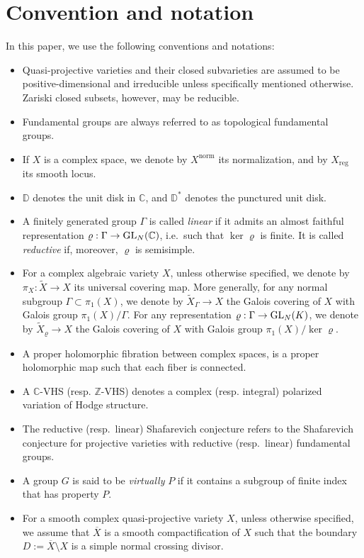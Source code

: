 \documentclass[english]{amsproc}
\theoremstyle{plain}
\theoremstyle{definition}
\theoremstyle{remark}
\theoremstyle{plain}
\numberwithin{equation}{thm} %
\newcommand{\bC}{\mathbb{C}}
\newcommand{\bD}{\mathbb{D}}
\newcommand{\GL}{{\rm GL}}
\begin{document}
		\section*{Convention and notation} In this paper, we use the following conventions and notations:
		\begin{itemize}[noitemsep]
			\item Quasi-projective varieties and their closed subvarieties are assumed to be positive-dimensional and irreducible unless specifically mentioned otherwise. Zariski closed subsets, however, may be reducible.  
			\item Fundamental groups are always referred to as topological fundamental groups.
			\item If \(X\) is a complex space, we denote by \(X^{\mathrm{norm}}\) its normalization, and by 
			\(X_{\mathrm{reg}}\) its smooth locus.
			\item $\bD$ denotes the unit disk in $\bC$, and $\bD^*$ denotes the punctured unit disk.  
			\item A finitely generated group $\Gamma$ is called \emph{linear} if it admits an almost faithful representation $\varrho:\Gamma \to \GL_N(\bC)$, i.e.\ such that $\ker \varrho$ is finite. 
			It is called \emph{reductive} if, moreover, $\varrho$ is semisimple.
			\item For a complex algebraic variety $X$, unless otherwise specified, we denote by $\pi_X:\widetilde{X}\to X$ its universal covering map. More generally, for any normal subgroup $\Gamma\subset \pi_1(X)$, we denote by $\widetilde{X}_\Gamma\to X$ the Galois covering of $X$ with Galois group $\pi_1(X)/\Gamma$.   For any representation $\varrho:\Gamma \to \GL_N(K)$,  we denote by $\widetilde{X}_\varrho\to X$ the  Galois covering of $X$ with Galois group $\pi_1(X)/\ker\varrho$.  
			\item A proper holomorphic fibration between complex spaces, is a proper holomorphic map such that each fiber is connected. 
			\item A $\mathbb{C}$-VHS (resp. $\mathbb{Z}$-VHS) denotes a complex (resp. integral) polarized 
			variation of Hodge structure.
			\item The reductive (resp.\ linear) Shafarevich conjecture refers to the Shafarevich conjecture 
			for projective varieties with reductive (resp.\ linear) fundamental groups. 
			\item A group \(G\) is said to be \emph{virtually} \(P\) if it contains a subgroup of finite index 
			that has property \(P\).
			\item For a smooth complex quasi-projective variety $X$, unless otherwise specified, we assume that $\overline{X}$ is a smooth compactification of $X$ such that the boundary $D := \overline{X} \setminus X$ is a simple normal crossing divisor.
			 

\end{itemize}
\end{document}
